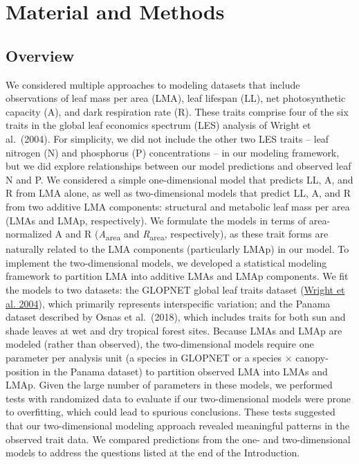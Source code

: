 \documentclass[
  12pt,
  a4paper,
,tablecaptionabove
]{scrartcl}
\begin{document}
\hypertarget{material-and-methods}{%
\section{Material and Methods}\label{material-and-methods}}

\hypertarget{overview}{%
\subsection{Overview}\label{overview}}

We considered multiple approaches to modeling datasets that include
observations of leaf mass per area (LMA), leaf lifespan (LL), net
photosynthetic capacity (A), and dark respiration rate (R). These traits
comprise four of the six traits in the global leaf economics spectrum
(LES) analysis of Wright et al.~(2004). For simplicity, we did not
include the other two LES traits -- leaf nitrogen (N) and phosphorus (P)
concentrations -- in our modeling framework, but we did explore
relationships between our model predictions and observed leaf N and P.
We considered a simple one-dimensional model that predicts LL, A, and R
from LMA alone, as well as two-dimensional models that predict LL, A,
and R from two additive LMA components: structural and metabolic leaf
mass per area (LMAs and LMAp, respectively). We formulate the models in
terms of area-normalized A and R (\emph{A}\textsubscript{area} and
\emph{R}\textsubscript{area}, respectively), as these trait forms are
naturally related to the LMA components (particularly LMAp) in our
model. To implement the two-dimensional models, we developed a
statistical modeling framework to partition LMA into additive LMAs and
LMAp components. We fit the models to two datasets: the GLOPNET global
leaf traits dataset (\protect\hyperlink{ref-Wright2004a}{Wright et al.
2004}), which primarily represents interspecific variation; and the
Panama dataset described by Osnas et al.~(2018), which includes traits
for both sun and shade leaves at wet and dry tropical forest sites.
Because LMAs and LMAp are modeled (rather than observed), the
two-dimensional models require one parameter per analysis unit (a
species in GLOPNET or a species \(\times\) canopy-position in the Panama
dataset) to partition observed LMA into LMAs and LMAp. Given the large
number of parameters in these models, we performed tests with randomized
data to evaluate if our two-dimensional models were prone to
overfitting, which could lead to spurious conclusions. These tests
suggested that our two-dimensional modeling approach revealed meaningful
patterns in the observed trait data. We compared predictions from the
one- and two-dimensional models to address the questions listed at the
end of the Introduction.
\end{document}
